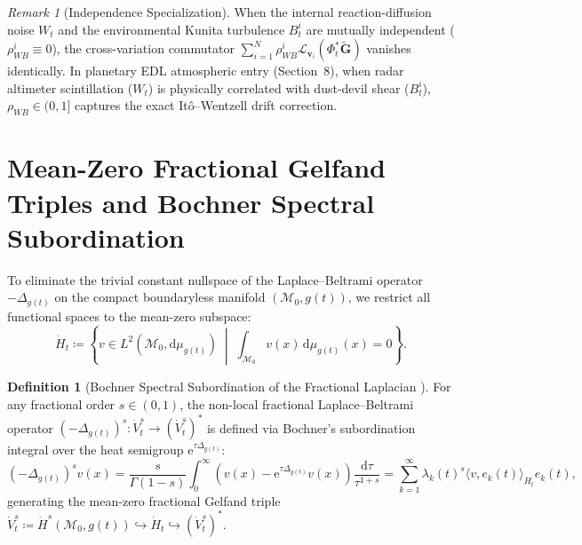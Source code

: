 \documentclass[11pt,a4paper,reqno]{article}
\theoremstyle{plain}
\theoremstyle{definition}
\newtheorem{definition}[theorem]{Definition}
\theoremstyle{remark}
\newtheorem{remark}[theorem]{Remark}
\numberwithin{equation}{section}
\begin{document}
\begin{remark}[Independence Specialization]\label{rem:independence_spec}
When the internal reaction-diffusion noise $W_t$ and the environmental Kunita turbulence $B_t^i$ are mutually independent ($\rho_{WB}^i \equiv 0$), the cross-variation commutator $\sum_{i=1}^N \rho_{WB}^i \mathcal{L}_{\mathbf{v}_i}(\Phi_t^*\tilde{\mathbf{G}})$ vanishes identically. In planetary EDL atmospheric entry (Section~8), when radar altimeter scintillation ($W_t$) is physically correlated with dust-devil shear ($B_t^i$), $\rho_{WB} \in (0, 1]$ captures the exact It\^o--Wentzell drift correction.
\end{remark}

\section{Mean-Zero Fractional Gelfand Triples and Bochner Spectral Subordination}
\label{sec:gelfand_triple}

To eliminate the trivial constant nullspace of the Laplace--Beltrami operator $-\Delta_{g(t)}$ on the compact boundaryless manifold $(\mathcal{M}_0, g(t))$, we restrict all functional spaces to the mean-zero subspace:
\begin{equation}\label{eq:mean_zero_hilbert}
  \dot{H}_t \coloneqq \left\{ v \in L^2(\mathcal{M}_0, \mathrm{d}\mu_{g(t)}) \;\middle|\; \int_{\mathcal{M}_0} v(x)\,\mathrm{d}\mu_{g(t)}(x) = 0 \right\}.
\end{equation}

\begin{definition}[Bochner Spectral Subordination of the Fractional Laplacian \cite{caffarelli2007extension, kwasnicki2017ten}]
For any fractional order $s \in (0, 1)$, the non-local fractional Laplace--Beltrami operator $(-\Delta_{g(t)})^s : \dot{V}_t^s \to (\dot{V}_t^s)^*$ is defined via Bochner's subordination integral over the heat semigroup $\mathrm{e}^{\tau \Delta_{g(t)}}$:
\begin{equation}\label{eq:bochner_subordination}
  (-\Delta_{g(t)})^s v(x) = \frac{s}{\Gamma(1-s)} \int_0^\infty \left( v(x) - \mathrm{e}^{\tau \Delta_{g(t)}} v(x) \right) \frac{\mathrm{d}\tau}{\tau^{1+s}} = \sum_{k=1}^\infty \lambda_k(t)^s \langle v, e_k(t) \rangle_{\dot{H}_t} e_k(t),
\end{equation}
generating the mean-zero fractional Gelfand triple $\dot{V}_t^s \coloneqq \dot{H}^s(\mathcal{M}_0, g(t)) \hookrightarrow \dot{H}_t \hookrightarrow (\dot{V}_t^s)^*$.
\end{definition}
\end{document}
